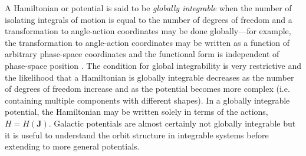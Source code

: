 A Hamiltonian or potential is said to be \emph{globally integrable} when the
number of isolating integrals of motion is equal to the number of degrees of
freedom and a transformation to angle-action coordinates may be done
globally---for example, the transformation to angle-action coordinates may be
written as a function of arbitrary phase-space coordinates and the functional
form is independent of phase-space position \citep[e.g.,][]{goldstein80}. The
condition for global integrability is very restrictive and the likelihood that a
Hamiltonian is globally integrable decreases as the number of degrees of freedom
increase \citep[e.g.,][]{lichtenberg83} and as the potential becomes more
complex (i.e. containing multiple components with different shapes). In a
globally integrable potential, the Hamiltonian may be written solely in terms of
the actions, $H = H(\boldsymbol{J})$. Galactic potentials are almost certainly
not globally integrable but it is useful to understand the orbit structure in
integrable systems before extending to more general potentials. 

